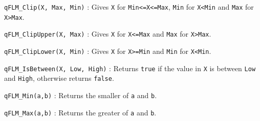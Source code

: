 \lstinline{qFLM_Clip(X, Max, Min)} :  Gives \lstinline{X} for \lstinline{Min<=X<=Max}, \lstinline{Min} for \lstinline{X<Min} and \lstinline{Max} for \lstinline{X>Max}.

\noindent\hrulefill

\lstinline{qFLM_ClipUpper(X, Max)} : Gives \lstinline{X} for \lstinline{X<=Max} and \lstinline{Max} for \lstinline{X>Max}.

\noindent\hrulefill

\lstinline{qFLM_ClipLower(X, Min)} : Gives \lstinline{X} for \lstinline{X>=Min} and \lstinline{Min} for \lstinline{X<Min}.

\noindent\hrulefill

\lstinline{qFLM_IsBetween(X, Low, High)} : Returns \lstinline{true} if the value in \lstinline{X} is between \lstinline{Low} and \lstinline{High}, otherwise returns \lstinline{false}.

\noindent\hrulefill

\lstinline{qFLM_Min(a,b)} : Returns the smaller of \lstinline{a} and \lstinline{b}.

\noindent\hrulefill

\lstinline{qFLM_Max(a,b)} :  Returns the greater of \lstinline{a} and \lstinline{b}.

\newpage